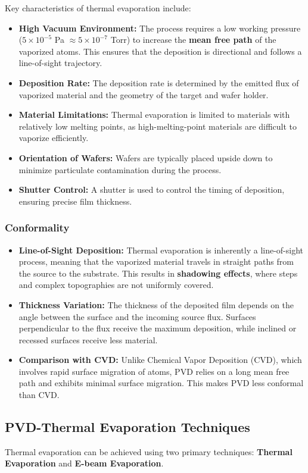 \documentclass{report}
\begin{document}
Key characteristics of thermal evaporation include:
\begin{itemize}
    \item \textbf{High Vacuum Environment:} The process requires a low working pressure ($5\times10^{-5}$ Pa $\approx 5\times10^{-7}$ Torr) to increase the \textbf{mean free path} of the vaporized atoms. This ensures that the deposition is directional and follows a line-of-sight trajectory.
    \item \textbf{Deposition Rate:} The deposition rate is determined by the emitted flux of vaporized material and the geometry of the target and wafer holder.
    \item \textbf{Material Limitations:} Thermal evaporation is limited to materials with relatively low melting points, as high-melting-point materials are difficult to vaporize efficiently.
    \item \textbf{Orientation of Wafers:} Wafers are typically placed upside down to minimize particulate contamination during the process.
    \item \textbf{Shutter Control:} A shutter is used to control the timing of deposition, ensuring precise film thickness.
\end{itemize}

\subsubsection{Conformality}
\begin{itemize}
    \item \textbf{Line-of-Sight Deposition:} Thermal evaporation is inherently a line-of-sight process, meaning that the vaporized material travels in straight paths from the source to the substrate. This results in \textbf{shadowing effects}, where steps and complex topographies are not uniformly covered.
    \item \textbf{Thickness Variation:} The thickness of the deposited film depends on the angle between the surface and the incoming source flux. Surfaces perpendicular to the flux receive the maximum deposition, while inclined or recessed surfaces receive less material.
    \item \textbf{Comparison with CVD:} Unlike Chemical Vapor Deposition (CVD), which involves rapid surface migration of atoms, PVD relies on a long mean free path and exhibits minimal surface migration. This makes PVD less conformal than CVD.
\end{itemize}

\subsection{PVD-Thermal Evaporation Techniques}
Thermal evaporation can be achieved using two primary techniques: \textbf{Thermal Evaporation} and \textbf{E-beam Evaporation}.
\end{document}
